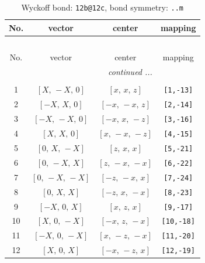 \documentclass[fleqn,8pt]{jsarticle}
\begin{document}
\begin{longtable}{cccc}
\caption{Wyckoff bond: {\tt 12b@12c}, bond symmetry: {\tt ..m}}
 \\
 \hline \hline
No. & vector & center & mapping \\ \hline \endfirsthead

\multicolumn{3}{l}{\tablename\ \thetable{}} \\
 \hline \hline
No. & vector & center & mapping \\ \hline \endhead

 \hline \hline
\multicolumn{3}{r}{\footnotesize\it continued ...} \\ \endfoot

 \hline \hline
\multicolumn{3}{r}{} \\ \endlastfoot

1 & $\left[ X,\, - X,\, 0 \right]$ & $\left[ x,\, x,\, z \right]$ & {\tt [1,-13]} \\ \hline
2 & $\left[ - X,\, X,\, 0 \right]$ & $\left[ - x,\, - x,\, z \right]$ & {\tt [2,-14]} \\ \hline
3 & $\left[ - X,\, - X,\, 0 \right]$ & $\left[ - x,\, x,\, - z \right]$ & {\tt [3,-16]} \\ \hline
4 & $\left[ X,\, X,\, 0 \right]$ & $\left[ x,\, - x,\, - z \right]$ & {\tt [4,-15]} \\ \hline
5 & $\left[ 0,\, X,\, - X \right]$ & $\left[ z,\, x,\, x \right]$ & {\tt [5,-21]} \\ \hline
6 & $\left[ 0,\, - X,\, X \right]$ & $\left[ z,\, - x,\, - x \right]$ & {\tt [6,-22]} \\ \hline
7 & $\left[ 0,\, - X,\, - X \right]$ & $\left[ - z,\, - x,\, x \right]$ & {\tt [7,-24]} \\ \hline
8 & $\left[ 0,\, X,\, X \right]$ & $\left[ - z,\, x,\, - x \right]$ & {\tt [8,-23]} \\ \hline
9 & $\left[ - X,\, 0,\, X \right]$ & $\left[ x,\, z,\, x \right]$ & {\tt [9,-17]} \\ \hline
10 & $\left[ X,\, 0,\, - X \right]$ & $\left[ - x,\, z,\, - x \right]$ & {\tt [10,-18]} \\ \hline
11 & $\left[ - X,\, 0,\, - X \right]$ & $\left[ x,\, - z,\, - x \right]$ & {\tt [11,-20]} \\ \hline
12 & $\left[ X,\, 0,\, X \right]$ & $\left[ - x,\, - z,\, x \right]$ & {\tt [12,-19]} \\
\end{longtable}
\renewcommand{\arraystretch}{1.2}
\end{document}
